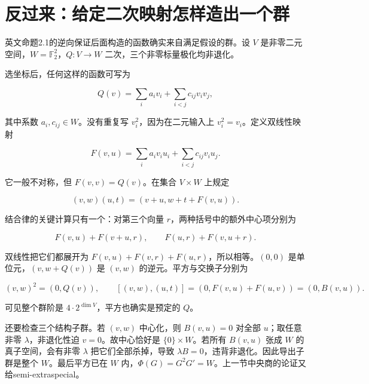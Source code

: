 \documentclass[UTF8,fontset=fandol,zihao=-4,openany,oneside]{ctexbook}
\begin{document}
\section{反过来：给定二次映射怎样造出一个群}


英文命题2.1的逆向保证后面构造的函数确实来自满足假设的群。设 \(V\) 是非零二元空间，\(W=\mathbb F_2^2\)，\(Q:V\to W\) 二次，三个非零标量极化均非退化。



选坐标后，任何这样的函数可写为



\[
Q(v)=\sum_i a_i v_i+\sum_{i<j}c_{ij}v_iv_j,
\]



其中系数 \(a_i,c_{ij}\in W\)。没有重复写 \(v_i^2\)，因为在二元输入上 \(v_i^2=v_i\)。定义双线性映射



\[
F(v,u)=\sum_i a_iv_iu_i+\sum_{i<j}c_{ij}v_i u_j.
\]



它一般不对称，但 \(F(v,v)=Q(v)\)。在集合 \(V\times W\) 上规定



\[
(v,w)(u,t)=(v+u,w+t+F(v,u)).\tag{英文(2.1)}
\]



结合律的关键计算只有一个：对第三个向量 \(r\)，两种括号中的额外中心项分别为



\[
F(v,u)+F(v+u,r),\qquad F(u,r)+F(v,u+r).
\]



双线性把它们都展开为 \(F(v,u)+F(v,r)+F(u,r)\)，所以相等。\((0,0)\) 是单位元，\((v,w+Q(v))\) 是 \((v,w)\) 的逆元。平方与交换子分别为



\[
(v,w)^2=(0,Q(v)),\qquad
[(v,w),(u,t)]=(0,F(v,u)+F(u,v))=(0,B(v,u)).
\]



可见整个群阶是 \(4\cdot2^{\dim V}\)，平方也确实是预定的 \(Q\)。



还要检查三个结构子群。若 \((v,w)\) 中心化，则 \(B(v,u)=0\) 对全部 \(u\)；取任意非零 \(\lambda\)，非退化性迫 \(v=0\)。故中心恰好是 \(\{0\}\times W\)。若所有 \(B(v,u)\) 张成 \(W\) 的真子空间，会有非零 \(\lambda\) 把它们全部杀掉，导致 \(\lambda B=0\)，违背非退化。因此导出子群是整个 \(W\)。最后平方已在 \(W\) 内，\(\Phi(G)=G^2G'=W\)。上一节中央商的论证又给semi-extraspecial。
\end{document}
